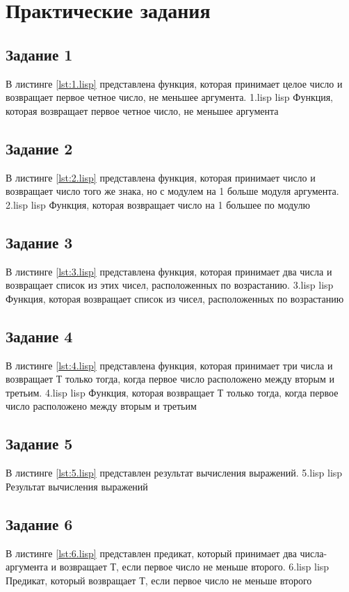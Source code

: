 \chapter{Практические задания}

\section{Задание 1}
В листинге \ref{lst:1.lisp} представлена функция, которая принимает целое число и возвращает первое четное число, не меньшее аргумента. 
{1.lisp}
{lisp}
{Функция, которая возвращает первое четное число, не меньшее аргумента}

\section{Задание 2}
В листинге \ref{lst:2.lisp} представлена функция, которая принимает число и возвращает число того же знака, но с модулем на 1 больше модуля аргумента.
{2.lisp}
{lisp}
{Функция, которая возвращает число на 1 большее по модулю}

\section{Задание 3}
В листинге \ref{lst:3.lisp} представлена функция, которая принимает два числа и возвращает список из этих чисел, расположенных по возрастанию.
{3.lisp}
{lisp}
{Функция, которая возвращает список из чисел, расположенных по возрастанию}

\section{Задание 4}
В листинге \ref{lst:4.lisp} представлена функция, которая принимает три числа и возвращает Т только тогда, когда первое число расположено между вторым и третьим.
{4.lisp}
{lisp}
{Функция, которая возвращает Т только тогда, когда первое число расположено между вторым и третьим}

\section{Задание 5}
В листинге \ref{lst:5.lisp} представлен результат вычисления выражений.
{5.lisp}
{lisp}
{Результат вычисления выражений}

\section{Задание 6}
В листинге \ref{lst:6.lisp} представлен предикат, который принимает два числа-аргумента и возвращает Т, если первое число не меньше второго.
{6.lisp}
{lisp}
{Предикат, который возвращает Т, если первое число не меньше второго}

